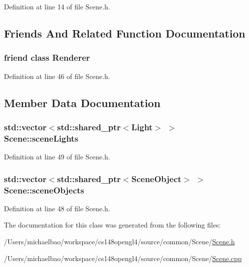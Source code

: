Definition at line 14 of file Scene.\+h.



\subsection{Friends And Related Function Documentation}
\hypertarget{class_scene_a70538530bc36e033e360880ef311df61}{}
\subsubsection[{Renderer}]{\setlength{\rightskip}{0pt plus 5cm}friend class {\bf Renderer}\hspace{0.3cm}{\ttfamily [friend]}}\label{class_scene_a70538530bc36e033e360880ef311df61}


Definition at line 46 of file Scene.\+h.



\subsection{Member Data Documentation}
\hypertarget{class_scene_a847f4f9c485a56b084a1340811f0e726}{}
\subsubsection[{scene\+Lights}]{\setlength{\rightskip}{0pt plus 5cm}std\+::vector$<$std\+::shared\+\_\+ptr$<${\bf Light}$>$ $>$ Scene\+::scene\+Lights\hspace{0.3cm}{\ttfamily [private]}}\label{class_scene_a847f4f9c485a56b084a1340811f0e726}


Definition at line 49 of file Scene.\+h.

\hypertarget{class_scene_a871382922b2a04d7883cf6d34529b5df}{}
\subsubsection[{scene\+Objects}]{\setlength{\rightskip}{0pt plus 5cm}std\+::vector$<$std\+::shared\+\_\+ptr$<${\bf Scene\+Object}$>$ $>$ Scene\+::scene\+Objects\hspace{0.3cm}{\ttfamily [private]}}\label{class_scene_a871382922b2a04d7883cf6d34529b5df}


Definition at line 48 of file Scene.\+h.



The documentation for this class was generated from the following files\+:\begin{DoxyCompactItemize}
\item 
/\+Users/michaelbao/workspace/cs148opengl4/source/common/\+Scene/\hyperlink{_scene_8h}{Scene.\+h}\item 
/\+Users/michaelbao/workspace/cs148opengl4/source/common/\+Scene/\hyperlink{_scene_8cpp}{Scene.\+cpp}\end{DoxyCompactItemize}
